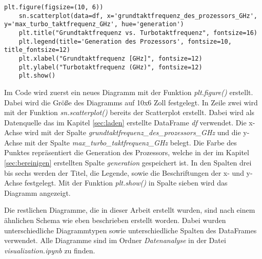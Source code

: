 \begin{lstlisting}[caption={\texttt{Code für den Scatterplot in Figur 5.1}},captionpos=b]
    plt.figure(figsize=(10, 6))
    sn.scatterplot(data=df, x='grundtaktfrequenz_des_prozessors_GHz', y='max_turbo_taktfrequenz_GHz', hue='generation')
    plt.title("Grundtaktfrequenz vs. Turbotaktfrequenz", fontsize=16)
    plt.legend(title='Generation des Prozessors', fontsize=10, title_fontsize=12)
    plt.xlabel("Grundtaktfrequenz [GHz]", fontsize=12)
    plt.ylabel("Turbotaktfrequenz (GHz)", fontsize=12)
    plt.show()
\end{lstlisting}

Im Code wird zuerst ein neues Diagramm mit der Funktion \textit{plt.figure()} erstellt. Dabei wird die Größe des Diagramms auf 10x6 Zoll festgelegt. In Zeile
zwei wird mit der Funktion \textit{sn.scatterplot()} bereits der Scatterplot erstellt. Dabei wird als Datenquelle das im Kapitel \ref{sec:laden} erstellte DataFrame
\textit{df} verwendet. Die x-Achse wird mit der Spalte \textit{grundtaktfrequenz\_des\_prozessors\_GHz} und die y-Achse mit der Spalte \textit{max\_turbo\_taktfrequenz\_GHz}
belegt. Die Farbe des Punktes repräsentiert die Generation des Prozessors, welche in der im Kapitel \ref{sec:bereinigen} erstellten Spalte \textit{generation} gespeichert ist.
In den Spalten drei bis sechs werden der Titel, die Legende, sowie die Beschriftungen der x- und y-Achse festgelegt. Mit der Funktion \textit{plt.show()} in Spalte sieben wird
das Diagramm angezeigt.

Die restlichen Diagramme, die in dieser Arbeit erstellt wurden, sind nach einem ähnlichen Schema wie eben beschrieben erstellt worden. Dabei wurden unterschiedliche Diagrammtypen
sowie unterschiedliche Spalten des DataFrames verwendet. Alle Diagramme sind im Ordner \textit{Datenanalyse} in der Datei \textit{visualization.ipynb} zu finden.